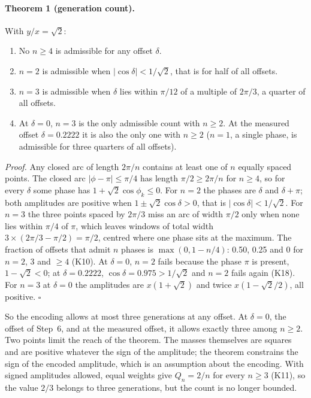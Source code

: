 \paragraph{Theorem 1 (generation count).} With $y/x=\sqrt2$:
\begin{enumerate}
\item No $n\ge4$ is admissible for any offset $\delta$.
\item $n=2$ is admissible when $|\cos\delta|<1/\sqrt2$, that is for half of all offsets.
\item $n=3$ is admissible when $\delta$ lies within $\pi/12$ of a multiple of $2\pi/3$, a quarter of all offsets.
\item At $\delta=0$, $n=3$ is the only admissible count with $n\ge2$. At the measured offset $\delta=0.2222$ it is also the only one with $n\ge2$ ($n=1$, a single phase, is admissible for three quarters of all offsets).
\end{enumerate}
\emph{Proof.} Any closed arc of length $2\pi/n$ contains at least one of $n$ equally spaced points. The closed arc
$|\phi-\pi|\le\pi/4$ has length $\pi/2\ge2\pi/n$ for $n\ge4$, so for every $\delta$ some phase has $1+\sqrt2\cos\phi_k\le0$. For $n=2$ the phases are $\delta$ and $\delta+\pi$; both amplitudes are positive when $1\pm\sqrt2\cos\delta>0$, that is
$|\cos\delta|<1/\sqrt2$. For $n=3$ the three points spaced by $2\pi/3$ miss an arc of width $\pi/2$ only when none lies within $\pi/4$ of $\pi$,
which leaves windows of total width $3\times(2\pi/3-\pi/2)=\pi/2$, centred where one phase sits at the maximum. The fraction of offsets that
admit $n$ phases is $\max(0,1-n/4)$: 0.50, 0.25 and 0 for $n=2$, 3 and $\ge4$ (K10). At $\delta=0$, $n=2$ fails because the phase $\pi$ is
present, $1-\sqrt2<0$; at $\delta=0.2222$, $\cos\delta=0.975>1/\sqrt2$ and $n=2$ fails again (K18). For $n=3$ at $\delta=0$ the amplitudes are
$x(1+\sqrt2)$ and twice $x(1-\sqrt2/2)$, all positive. $\square$ \derived

So the encoding allows at most three generations at any offset. At $\delta=0$, the offset of Step~6, and at the measured
offset, it allows exactly three among $n\ge2$. Two points limit the reach of the theorem. The masses themselves are squares and are positive whatever the
sign of the amplitude; the theorem constrains the sign of the encoded amplitude, which is an assumption about the encoding. \derived{} With signed
amplitudes allowed, equal weights give $Q_n=2/n$ for every $n\ge3$ (K11), so the value $2/3$ belongs to three generations, but the count is no
longer bounded. \calc

